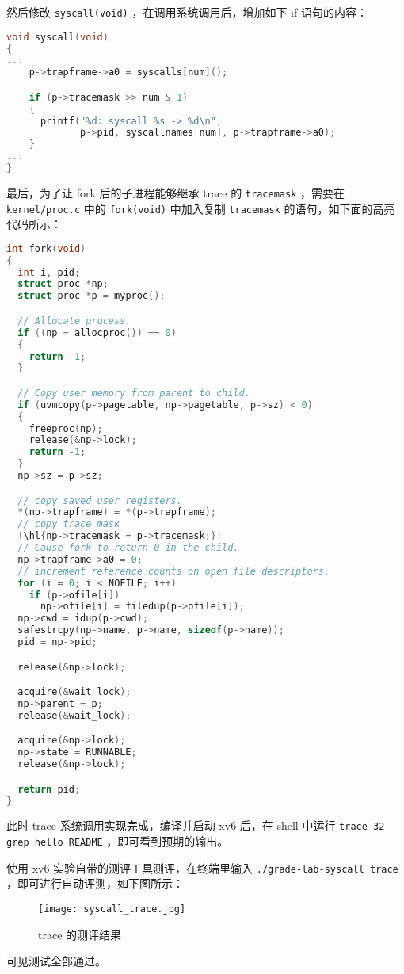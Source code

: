 然后修改 \lstinline{syscall(void)} ，在调用系统调用后，增加如下 if 语句的内容：
\begin{lstlisting}[language=C,escapechar={!}]
void syscall(void)
{
...
    p->trapframe->a0 = syscalls[num]();

    if (p->tracemask >> num & 1)
    {
      printf("%d: syscall %s -> %d\n",
             p->pid, syscallnames[num], p->trapframe->a0);
    }
...
}
\end{lstlisting}

最后，为了让 fork 后的子进程能够继承 trace 的 \lstinline{tracemask} ，需要在 \lstinline{kernel/proc.c} 中的 \lstinline{fork(void)} 中加入复制 \lstinline{tracemask} 的语句，如下面的高亮代码所示：
\begin{lstlisting}[language=C,escapechar={!}]
int fork(void)
{
  int i, pid;
  struct proc *np;
  struct proc *p = myproc();

  // Allocate process.
  if ((np = allocproc()) == 0)
  {
    return -1;
  }

  // Copy user memory from parent to child.
  if (uvmcopy(p->pagetable, np->pagetable, p->sz) < 0)
  {
    freeproc(np);
    release(&np->lock);
    return -1;
  }
  np->sz = p->sz;

  // copy saved user registers.
  *(np->trapframe) = *(p->trapframe);
  // copy trace mask
  !\hl{np->tracemask = p->tracemask;}!
  // Cause fork to return 0 in the child.
  np->trapframe->a0 = 0;
  // increment reference counts on open file descriptors.
  for (i = 0; i < NOFILE; i++)
    if (p->ofile[i])
      np->ofile[i] = filedup(p->ofile[i]);
  np->cwd = idup(p->cwd);
  safestrcpy(np->name, p->name, sizeof(p->name));
  pid = np->pid;

  release(&np->lock);

  acquire(&wait_lock);
  np->parent = p;
  release(&wait_lock);

  acquire(&np->lock);
  np->state = RUNNABLE;
  release(&np->lock);

  return pid;
}
\end{lstlisting}


此时 trace 系统调用实现完成，编译并启动 xv6 后，在 shell 中运行 \lstinline{trace 32 grep hello README} ，即可看到预期的输出。

使用 xv6 实验自带的测评工具测评，在终端里输入 \lstinline{./grade-lab-syscall trace} ，即可进行自动评测，如下图所示：
\begin{figure}[H]
  \centering
  \texttt{[image: syscall\_trace.jpg]}
  \caption{ trace 的测评结果}
\end{figure}
可见测试全部通过。

